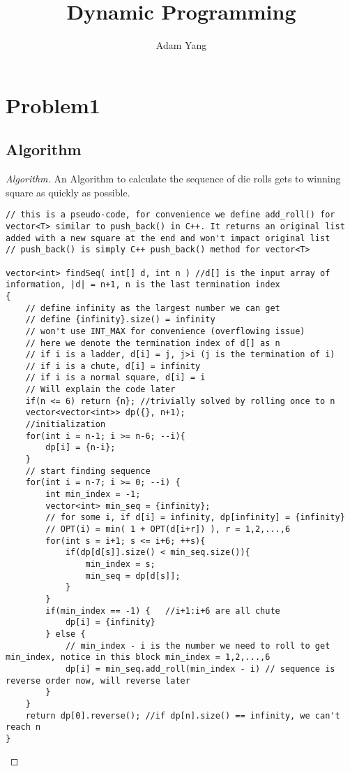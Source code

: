 \documentclass[openany]{article}
\begin{document}
\title{Dynamic Programming}
\author{Adam Yang}
\maketitle




\section*{Problem1}

\subsection*{Algorithm}
\begin{proof}[Algorithm]{}
		\renewcommand{\qedsymbol}{}
		An Algorithm to calculate the sequence of die rolls gets to winning square as quickly as possible.
		\begin{lstlisting}[basicstyle=\fontsize{8}{9}\selectfont\ttfamily]
// this is a pseudo-code, for convenience we define add_roll() for vector<T> similar to push_back() in C++. It returns an original list added with a new square at the end and won't impact original list
// push_back() is simply C++ push_back() method for vector<T>

vector<int> findSeq( int[] d, int n ) //d[] is the input array of information, |d| = n+1, n is the last termination index
{
    // define infinity as the largest number we can get
    // define {infinity}.size() = infinity
    // won't use INT_MAX for convenience (overflowing issue)
    // here we denote the termination index of d[] as n
    // if i is a ladder, d[i] = j, j>i (j is the termination of i)
    // if i is a chute, d[i] = infinity
    // if i is a normal square, d[i] = i
    // Will explain the code later
    if(n <= 6) return {n}; //trivially solved by rolling once to n
    vector<vector<int>> dp({}, n+1);
    //initialization
    for(int i = n-1; i >= n-6; --i){
        dp[i] = {n-i};
    }
    // start finding sequence
    for(int i = n-7; i >= 0; --i) {
        int min_index = -1;
        vector<int> min_seq = {infinity};
        // for some i, if d[i] = infinity, dp[infinity] = {infinity}
        // OPT(i) = min( 1 + OPT(d[i+r]) ), r = 1,2,...,6
        for(int s = i+1; s <= i+6; ++s){
            if(dp[d[s]].size() < min_seq.size()){
                min_index = s;
                min_seq = dp[d[s]];
            }
        }
        if(min_index == -1) {   //i+1:i+6 are all chute
            dp[i] = {infinity}
        } else {
            // min_index - i is the number we need to roll to get min_index, notice in this block min_index = 1,2,...,6
            dp[i] = min_seq.add_roll(min_index - i) // sequence is reverse order now, will reverse later
        }
    }
    return dp[0].reverse(); //if dp[n].size() == infinity, we can't reach n
}
		\end{lstlisting} 
\end{proof}
\end{document}
